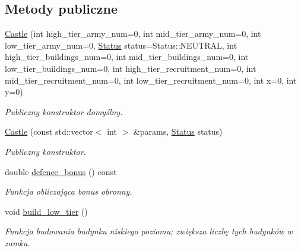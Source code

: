 \subsection*{Metody publiczne}
\begin{DoxyCompactItemize}
\item 
\hyperlink{classmodel_1_1Castle_a26e1b6313f73e34d1babd517f5d56c1f}{Castle} (int high\+\_\+tier\+\_\+army\+\_\+num=0, int mid\+\_\+tier\+\_\+army\+\_\+num=0, int low\+\_\+tier\+\_\+army\+\_\+num=0, \hyperlink{status_8hpp_a822822ece62ee330ee656034849df887}{Status} status=Status\+::\+N\+E\+U\+T\+R\+AL, int high\+\_\+tier\+\_\+buildings\+\_\+num=0, int mid\+\_\+tier\+\_\+buildings\+\_\+num=0, int low\+\_\+tier\+\_\+buildings\+\_\+num=0, int high\+\_\+tier\+\_\+recruitment\+\_\+num=0, int mid\+\_\+tier\+\_\+recruitment\+\_\+num=0, int low\+\_\+tier\+\_\+recruitment\+\_\+num=0, int x=0, int y=0)
\begin{DoxyCompactList}\small\item\em Publiczny konstruktor domyślny. \end{DoxyCompactList}\item 
\hyperlink{classmodel_1_1Castle_af4e3122af95b49521d4b57d7ec671712}{Castle} (const std\+::vector$<$ int $>$ \&params, \hyperlink{status_8hpp_a822822ece62ee330ee656034849df887}{Status} status)
\begin{DoxyCompactList}\small\item\em Publiczny konstruktor. \end{DoxyCompactList}\item 
\mbox{\label{classmodel_1_1Castle_a3ee46a8f9e30c7e1ff7bef9d650c233e}} 
double \hyperlink{classmodel_1_1Castle_a3ee46a8f9e30c7e1ff7bef9d650c233e}{defence\+\_\+bonus} () const
\begin{DoxyCompactList}\small\item\em Funkcja obliczająca bonus obronny. \end{DoxyCompactList}\item 
\mbox{\label{classmodel_1_1Castle_a668531c7d4699e36dc7f1f4d449653dc}} 
void \hyperlink{classmodel_1_1Castle_a668531c7d4699e36dc7f1f4d449653dc}{build\+\_\+low\+\_\+tier} ()
\begin{DoxyCompactList}\small\item\em Funkcja budowania budynku niskiego poziomu; zwiększa liczbę tych budynków w zamku. \end{DoxyCompactList}\item 

\end{DoxyCompactItemize}
